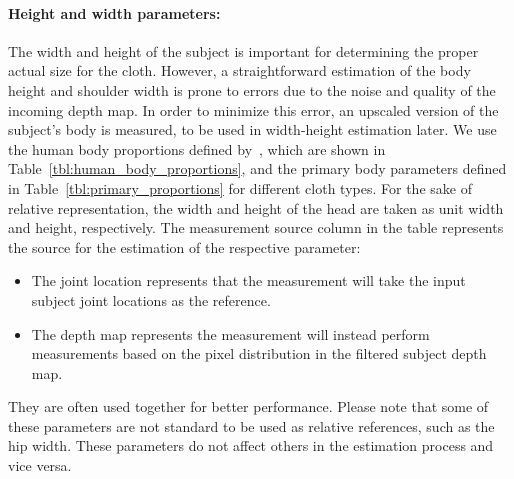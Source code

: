 \documentclass[number,preprint,review,12pt]{elsarticle}
\begin{document}
\doublespacing

\paragraph{Height and width parameters:}

The width and height of the subject is important for determining the proper actual size for the cloth. However, a straightforward estimation of the body height and shoulder width is prone to errors due to the noise and quality of the incoming depth map. In order to minimize this error, an upscaled version of the subject's body is measured, to be used in width-height estimation later. We use the human body proportions defined by~\cite{Willis2012}, which are shown in Table~\ref{tbl:human_body_proportions}, and {\color{red} the primary body parameters defined in Table~\ref{tbl:primary_proportions} for different cloth types}. For the sake of relative representation, the width and height of the head are taken as unit width and height, respectively. The measurement source column in the table represents the source for the estimation of the respective parameter:
\begin{itemize} 
\item
The joint location represents that the measurement will take the input subject joint locations as the reference.
\item 
The depth map represents the measurement will instead perform measurements based on the pixel distribution in the filtered subject depth map. 
\end{itemize}
They are often used together for better performance. Please note that some of these parameters are not standard to be used as relative references, such as the hip width. These parameters do not affect others in the estimation process and vice versa.
\end{document}
